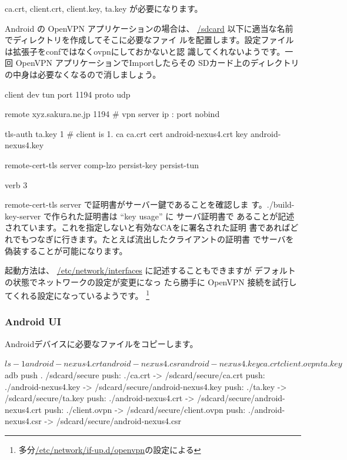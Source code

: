\documentclass[mingoth,a4paper]{jsarticle}
\begin{document}
ca.crt, client.crt, client.key, ta.key が必要になります。

Android の OpenVPN アプリケーションの場合\cite{openvpnconnectandroid}は、
\url{/sdcard} 以下に適当な名前でディレクトリを作成してそこに必要なファイ
ルを配置します。設定ファイルは拡張子をconfではなくovpnにしておかないと認
識してくれないようです。一回 OpenVPN アプリケーションでImportしたらその
SDカード上のディレクトリの中身は必要なくなるので消しましょう。

\begin{commandline}
client
dev tun
port 1194
proto udp

remote xyz.sakura.ne.jp 1194             # vpn server ip : port
nobind

tls-auth      ta.key 1 # client is 1.
ca ca.crt
cert android-nexus4.crt
key android-nexus4.key

remote-cert-tls server
comp-lzo
persist-key
persist-tun

verb 3

\end{commandline}

remote-cert-tls server で証明書がサーバー鍵であることを確認しま
す。./build-key-server で作られた証明書は ``key usage'' に サーバ証明書で
あることが記述されています。これを指定しないと有効なCAをに署名された証明
書であればどれでもつなぎに行きます。たとえば流出したクライアントの証明書
でサーバを偽装することが可能になります。

起動方法は、 \url{/etc/network/interfaces} に記述することもできますが
\cite{openvpnreadmedebian}デフォルトの状態でネットワークの設定が変更になっ
たら勝手に OpenVPN 接続を試行してくれる設定になっているようです。
\footnote{多分\url{/etc/network/if-up.d/openvpn}の設定による}

\subsubsection{Android UI}

Androidデバイスに必要なファイルをコピーします。
\begin{commandline}
$ ls -1 
android-nexus4.crt
android-nexus4.csr
android-nexus4.key
ca.crt
client.ovpn
ta.key
$ adb push . /sdcard/secure
push: ./ca.crt -> /sdcard/secure/ca.crt
push: ./android-nexus4.key -> /sdcard/secure/android-nexus4.key
push: ./ta.key -> /sdcard/secure/ta.key
push: ./android-nexus4.crt -> /sdcard/secure/android-nexus4.crt
push: ./client.ovpn -> /sdcard/secure/client.ovpn
push: ./android-nexus4.csr -> /sdcard/secure/android-nexus4.csr
\end{commandline}
\end{document}
